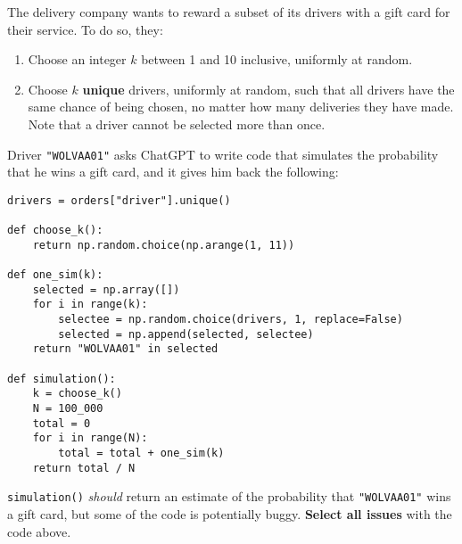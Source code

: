 \documentclass[twoside,12pt]{article}
\begin{document}
\begin{probset}
\begin{prob}[(9 pts)]
\begin{subprobset}
\begin{subprob}

\end{subprob}

\end{subprobset}

\end{prob}

\newpage

\begin{prob}[(7 pts)]

The delivery company wants to reward a subset of its drivers with a gift card for their service. To do so, they:

\begin{enumerate}
    \item Choose an integer $k$ between 1 and 10 inclusive, uniformly at random.
    \item Choose $k$ \textbf{unique} drivers, uniformly at random, such that all drivers have the same chance of being chosen, no matter how many deliveries they have made. Note that a driver cannot be selected more than once.
\end{enumerate}

Driver \texttt{"WOLVAA01"} asks ChatGPT to write code that simulates the probability that he wins a gift card, and it gives him back the following:

\begin{verbatim}
drivers = orders["driver"].unique()

def choose_k():
    return np.random.choice(np.arange(1, 11))

def one_sim(k):
    selected = np.array([])
    for i in range(k):
        selectee = np.random.choice(drivers, 1, replace=False)
        selected = np.append(selected, selectee)
    return "WOLVAA01" in selected

def simulation():
    k = choose_k()
    N = 100_000
    total = 0
    for i in range(N):
        total = total + one_sim(k)
    return total / N
\end{verbatim}

\texttt{simulation()} \textit{should} return an estimate of the probability that \texttt{"WOLVAA01"} wins a gift card, but some of the code is potentially buggy. \textbf{Select all issues} with the code above.



\end{prob}
\end{probset}
\end{document}
